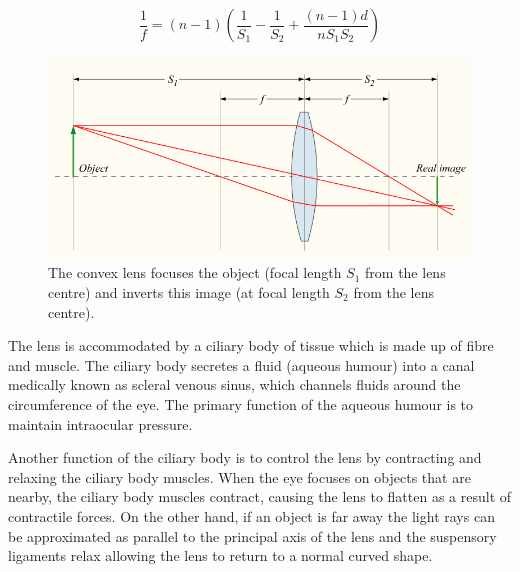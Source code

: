 \begin{equation}
 \frac{1}{f} = (n-1) \left( \frac{1}{S_1} - \frac{1}{S_2} + \frac{(n-1)d}{n S_1 S_2} \right)
\label{eq:lens_makers}
\end{equation}

\begin{figure}[H]
\centering
  \includegraphics[width=12cm]{figures/convergent_lens2}
\caption{The convex lens focuses the object (focal length $S_1$ from the lens centre)
         and inverts this image (at focal length $S_2$ from the lens centre).
         \cite{greivenkamp2004field}}
\label{fig:convergent_lens}
\end{figure}

The lens is accommodated by a ciliary body of tissue which is made up of fibre and
muscle. The ciliary body secretes a fluid (aqueous humour) into a canal medically
known as scleral venous sinus, which channels fluids around the circumference of
the eye.\cite{bill1970effects,dvorak1934schlemm} The primary function of the
aqueous humour is to maintain intraocular pressure.

Another function of the ciliary body is to control the lens by contracting and relaxing the
ciliary body muscles. When the eye focuses on objects that are nearby, the ciliary body
muscles contract, causing the lens to flatten as a result of contractile forces. On the
other hand, if an  object is far away the light rays can be approximated as parallel to the
principal axis of the lens and the suspensory ligaments relax allowing the lens to return
to a normal curved shape.


